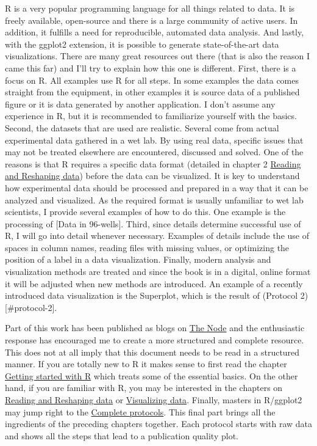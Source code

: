 \documentclass[
]{book}
\begin{document}
R is a very popular programming language for all things related to data. It is freely available, open-source and there is a large community of active users. In addition, it fulfills a need for reproducible, automated data analysis. And lastly, with the ggplot2 extension, it is possible to generate state-of-the-art data visualizations. There are many great resources out there (that is also the reason I came this far) and I'll try to explain how this one is different.
First, there is a focus on R. All examples use R for all steps. In some examples the data comes straight from the equipment, in other examples it is source data of a published figure or it is data generated by another application. I don't assume any experience in R, but it is recommended to familiarize yourself with the basics.
Second, the datasets that are used are realistic. Several come from actual experimental data gathered in a wet lab. By using real data, specific issues that may not be treated elsewhere are encountered, discussed and solved. One of the reasons is that R requires a specific data format (detailed in chapter 2 \protect\hyperlink{read-and-reshape}{Reading and Reshaping data}) before the data can be visualized. It is key to understand how experimental data should be processed and prepared in a way that it can be analyzed and visualized. As the required format is usually unfamiliar to wet lab scientists, I provide several examples of how to do this. One example is the processing of {[}Data in 96-wells{]}.
Third, since details determine successful use of R, I will go into detail whenever necessary. Examples of details include the use of spaces in column names, reading files with missing values, or optimizing the position of a label in a data visualization.
Finally, modern analysis and visualization methods are treated and since the book is in a digital, online format it will be adjusted when new methods are introduced. An example of a recently introduced data visualization is the Superplot, which is the result of (Protocol 2){[}\#protocol-2{]}.

Part of this work has been published as blogs on \href{https://thenode.biologists.com}{The Node} and the enthusiastic response has encouraged me to create a more structured and complete resource. This does not at all imply that this document needs to be read in a structured manner. If you are totally new to R it makes sense to first read the chapter \protect\hyperlink{getting-started}{Getting started with R} which treats some of the essential basics. On the other hand, if you are familiar with R, you may be interested in the chapters on \protect\hyperlink{read-and-reshape}{Reading and Reshaping data} or \protect\hyperlink{plotting-the-data}{Visualizing data}. Finally, masters in R/ggplot2 may jump right to the \protect\hyperlink{complete-protocols}{Complete protocols}. This final part brings all the ingredients of the preceding chapters together. Each protocol starts with raw data and shows all the steps that lead to a publication quality plot.
\end{document}
